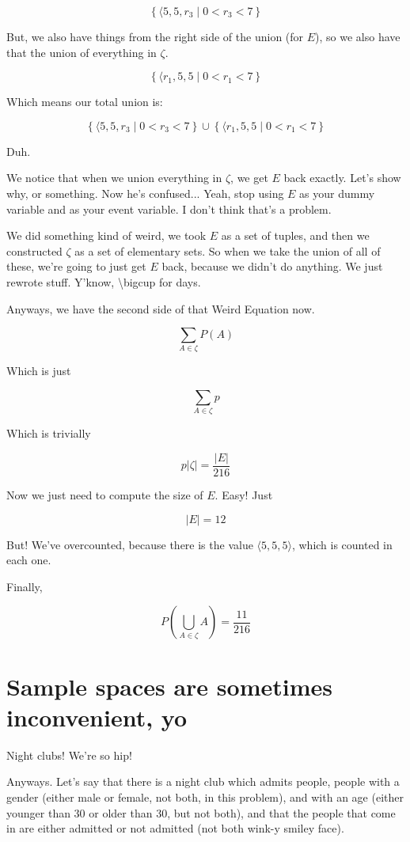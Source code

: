 \documentclass{article}
\begin{document}
\[
\left\{\langle 5,5,r_3\mid 0<r_3<7\right\}
\]

But, we also have things from the right side of the union (for $E$),
so we also have that the union of everything in $\zeta$.

\[
\left\{\langle r_1,5,5\mid 0<r_1<7\right\}
\]

Which means our total union is:

\[
\left\{\langle 5,5,r_3\mid 0<r_3<7\right\}
\cup
\left\{\langle r_1,5,5\mid 0<r_1<7\right\}
\]

Duh.

We notice that when we union everything in $\zeta$, we get $E$ back
exactly. Let's show why, or something. Now he's confused... Yeah, stop
using $E$ as your dummy variable and as your event variable. I don't
think that's a problem.

We did something kind of weird, we took $E$ as a set of tuples, and
then we constructed $\zeta$ as a set of elementary sets. So when we
take the union of all of these, we're going to just get $E$ back,
because we didn't do anything. We just rewrote stuff. Y'know,
\textbackslash bigcup for days.

Anyways, we have the second side of that Weird Equation now.

\[
\sum\limits_{A\in\zeta}P(A)
\]

Which is just

\[
\sum\limits_{A\in\zeta} p
\]

Which is trivially

\[
p\left|\zeta\right| = \frac{|E|}{216}
\]

Now we just need to compute the size of $E$. Easy! Just

\[
|E| = 12
\]

But! We've overcounted, because there is the value
$\langle{}5,5,5\rangle$, which is counted in each one.

Finally,

\[
P\left(\bigcup\limits_{A\in\zeta} A\right) = \frac{11}{216}
\]

\section*{Sample spaces are sometimes inconvenient, yo}

Night clubs! We're so hip!

Anyways. Let's say that there is a night club which admits people,
people with a gender (either male or female, not both, in this
problem), and with an age (either younger than 30 or older than 30,
but not both), and that the people that come in are either admitted or
not admitted (not both wink-y smiley face).
\end{document}
